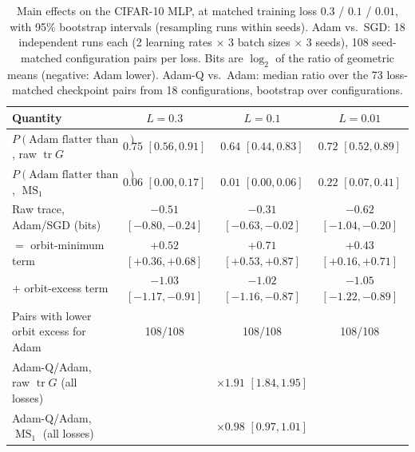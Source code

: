 \documentclass[10pt]{article}
\theoremstyle{remark}
\newcommand{\tr}{\operatorname{tr}}
\newcommand{\MS}{\operatorname{MS}}
\begin{document}
\begin{table}[t]
\centering
\small
\caption{Main effects on the CIFAR-10 MLP, at matched training loss $0.3$ / $0.1$ / $0.01$, with 95\% bootstrap intervals (resampling runs within seeds). Adam vs.\ SGD: 18 independent runs each (2 learning rates $\times$ 3 batch sizes $\times$ 3 seeds), 108 seed-matched configuration pairs per loss. Bits are $\log_2$ of the ratio of geometric means (negative: Adam lower). Adam-Q vs.\ Adam: median ratio over the 73 loss-matched checkpoint pairs from 18 configurations, bootstrap over configurations.}
\label{tab:main}
\begin{tabular}{@{}lccc@{}}
\toprule
Quantity & $L=0.3$ & $L=0.1$ & $L=0.01$\\
\midrule
$P(\text{Adam flatter than SGD})$, raw $\tr G$ & $0.75$ $[0.56,0.91]$ & $0.64$ $[0.44,0.83]$ & $0.72$ $[0.52,0.89]$\\
$P(\text{Adam flatter than SGD})$, $\MS_1$ & $0.06$ $[0.00,0.17]$ & $0.01$ $[0.00,0.06]$ & $0.22$ $[0.07,0.41]$\\
Raw trace, Adam/SGD (bits) & $-0.51$ $[-0.80,-0.24]$ & $-0.31$ $[-0.63,-0.02]$ & $-0.62$ $[-1.04,-0.20]$\\
\quad $=$ orbit-minimum term & $+0.52$ $[+0.36,+0.68]$ & $+0.71$ $[+0.53,+0.87]$ & $+0.43$ $[+0.16,+0.71]$\\
\quad $+$ orbit-excess term & $-1.03$ $[-1.17,-0.91]$ & $-1.02$ $[-1.16,-0.87]$ & $-1.05$ $[-1.22,-0.89]$\\
Pairs with lower orbit excess for Adam & 108/108 & 108/108 & 108/108\\
\midrule
Adam-Q/Adam, raw $\tr G$ (all losses) & \multicolumn{3}{c}{$\times1.91$ $[1.84,1.95]$}\\
Adam-Q/Adam, $\MS_1$ (all losses) & \multicolumn{3}{c}{$\times0.98$ $[0.97,1.01]$}\\
\bottomrule
\end{tabular}
\end{table}
\end{document}
